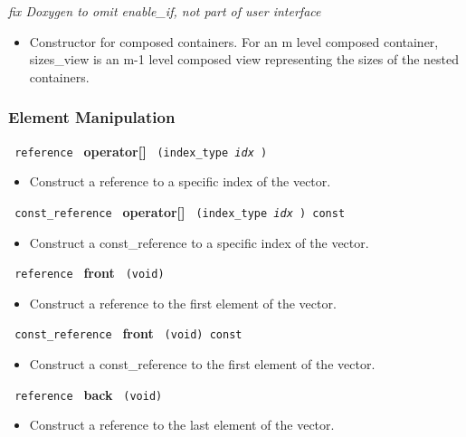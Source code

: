 \vspace{0.4cm} \emph{fix Doxygen to omit enable\_if, not part of user interface}

\begin{itemize}
\item
Constructor for composed containers. For an m level composed container, sizes\_view is an m-1 level composed view representing the sizes of the nested containers. 
\end{itemize}

\subsubsection{Element Manipulation}

\noindent
\texttt{%
reference
}
\textbf{operator[]}%
\texttt{%
(index\_type 
\textit{idx}%
)
}

\begin{itemize}
\item
Construct a reference to a specific index of the vector.
\end{itemize}
 
\noindent%
\texttt{%
const\_reference
}
\textbf{operator[]}%
\texttt{%
(index\_type 
\textit{idx}%
) const
}

\begin{itemize}
\item
Construct a const\_reference to a specific index of the vector.
\end{itemize}
 
\noindent
\texttt{%
reference
}
\textbf{front}%
\texttt{%
(void)
}

\begin{itemize}
\item
Construct a reference to the first element of the vector.
\end{itemize}
 
\noindent
\texttt{%
const\_reference
}
\textbf{front}%
\texttt{%
(void) const
}

\begin{itemize}
\item
Construct a const\_reference to the first element of the vector.
\end{itemize}
 
\noindent
\texttt{%
reference
}
\textbf{back}%
\texttt{%
(void)
}

\begin{itemize}
\item
Construct a reference to the last element of the vector.
\end{itemize}
 
